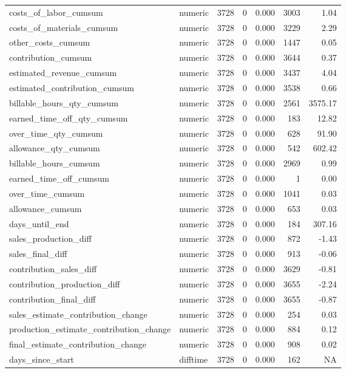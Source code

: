 \begin{landscape}
\begin{longtable}[t]{llrrrrr}
costs\_of\_labor\_cumsum & numeric & 3728 & 0 & 0.000 & 3003 & 1.04\\
costs\_of\_materials\_cumsum & numeric & 3728 & 0 & 0.000 & 3229 & 2.29\\
other\_costs\_cumsum & numeric & 3728 & 0 & 0.000 & 1447 & 0.05\\
contribution\_cumsum & numeric & 3728 & 0 & 0.000 & 3644 & 0.37\\
estimated\_revenue\_cumsum & numeric & 3728 & 0 & 0.000 & 3437 & 4.04\\
estimated\_contribution\_cumsum & numeric & 3728 & 0 & 0.000 & 3538 & 0.66\\
billable\_hours\_qty\_cumsum & numeric & 3728 & 0 & 0.000 & 2561 & 3575.17\\
earned\_time\_off\_qty\_cumsum & numeric & 3728 & 0 & 0.000 & 183 & 12.82\\
over\_time\_qty\_cumsum & numeric & 3728 & 0 & 0.000 & 628 & 91.90\\
allowance\_qty\_cumsum & numeric & 3728 & 0 & 0.000 & 542 & 602.42\\
billable\_hours\_cumsum & numeric & 3728 & 0 & 0.000 & 2969 & 0.99\\
earned\_time\_off\_cumsum & numeric & 3728 & 0 & 0.000 & 1 & 0.00\\
over\_time\_cumsum & numeric & 3728 & 0 & 0.000 & 1041 & 0.03\\
allowance\_cumsum & numeric & 3728 & 0 & 0.000 & 653 & 0.03\\
days\_until\_end & numeric & 3728 & 0 & 0.000 & 184 & 307.16\\
sales\_production\_diff & numeric & 3728 & 0 & 0.000 & 872 & -1.43\\
sales\_final\_diff & numeric & 3728 & 0 & 0.000 & 913 & -0.06\\
contribution\_sales\_diff & numeric & 3728 & 0 & 0.000 & 3629 & -0.81\\
contribution\_production\_diff & numeric & 3728 & 0 & 0.000 & 3655 & -2.24\\
contribution\_final\_diff & numeric & 3728 & 0 & 0.000 & 3655 & -0.87\\
sales\_estimate\_contribution\_change & numeric & 3728 & 0 & 0.000 & 254 & 0.03\\
production\_estimate\_contribution\_change & numeric & 3728 & 0 & 0.000 & 884 & 0.12\\
final\_estimate\_contribution\_change & numeric & 3728 & 0 & 0.000 & 908 & 0.02\\
days\_since\_start & difftime & 3728 & 0 & 0.000 & 162 & NA\\

\end{longtable}
\end{landscape}
